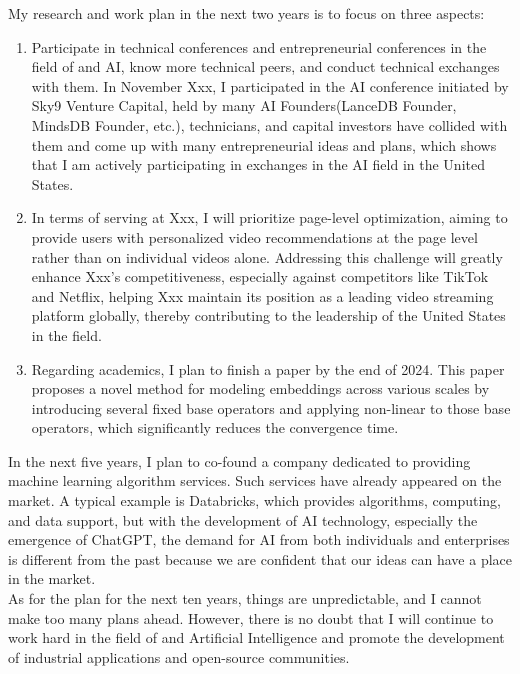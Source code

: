 \documentclass[11pt]{article}
\begin{document}
My research and work plan in the next two years is to focus on three aspects:
\begin{enumerate}
    \item Participate in technical conferences and entrepreneurial conferences in the field of \fie{} and AI, know more technical peers, and conduct technical exchanges with them. In November Xxx, I participated in the AI conference initiated by Sky9 Venture Capital, held by many AI Founders(LanceDB Founder, MindsDB Founder, etc.), technicians, and capital investors have collided with them and come up with many entrepreneurial ideas and plans, which shows that I am actively participating in exchanges in the AI field in the United States. \cite{ai_happy_hour}

    \item In terms of serving at Xxx, I will prioritize page-level optimization, aiming to provide users with personalized video recommendations at the page level rather than on individual videos alone. Addressing this challenge will greatly enhance Xxx's competitiveness, especially against competitors like TikTok and Netflix, helping Xxx maintain its position as a leading video streaming platform globally, thereby contributing to the leadership of the United States in the field.

    \item Regarding academics, I plan to finish a paper by the end of 2024. This paper proposes a novel method for modeling embeddings across various scales by introducing several fixed base operators and applying non-linear to those base operators, which significantly reduces the convergence time.
\end{enumerate}


In the next five years, I plan to co-found a company dedicated to providing machine learning algorithm services. Such services have already appeared on the market. A typical example is Databricks, which provides algorithms, computing, and data support, but with the development of AI technology, especially the emergence of ChatGPT, the demand for AI from both individuals and enterprises is different from the past because we are confident that our ideas can have a place in the market. \\

As for the plan for the next ten years, things are unpredictable, and I cannot make too many plans ahead. However, there is no doubt that I will continue to work hard in the field of \fie{} and Artificial Intelligence and promote the development of industrial applications and open-source communities. \\ 
\end{document}
